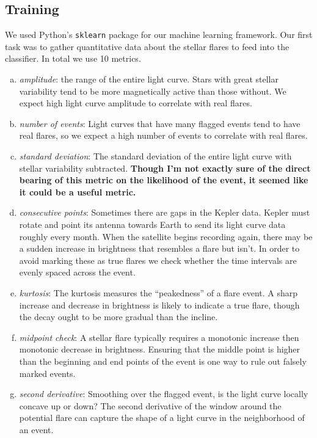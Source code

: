 \documentclass[11pt]{article}
\begin{document}
\subsection{Training}
\label{sec:train}
We used Python's \verb|sklearn| package for our machine learning
framework.  Our first task was to gather quantitative data about the
stellar flares to feed into the classifier.  In total we use 10
metrics.
\begin{enumerate}[(a)]
\item \emph{amplitude}: the range of the entire light curve.  Stars
  with great stellar variability tend to be more magnetically active
  than those without.  We expect high light curve amplitude to
  correlate with real flares.
\item \emph{number of events}: Light curves that have many flagged
  events tend to have real flares, so we expect a high number of
  events to correlate with real flares.
\item \emph{standard deviation}: The standard deviation of the entire
  light curve with stellar variability subtracted.  \textbf{Though I'm
    not exactly sure of the direct bearing of this metric on the
    likelihood of the event, it seemed like it could be a useful
    metric.}
\item \emph{consecutive points}: Sometimes there are gaps in the
  Kepler data.  Kepler must rotate and point its antenna towards Earth
  to send its light curve data roughly every month.  When the
  satellite begins recording again, there may be a sudden increase in
  brightness that resembles a flare but isn't.  In order to avoid
  marking these as true flares we check whether the time intervals are
  evenly spaced across the event.
\item \emph{kurtosis}: The kurtosis measures the ``peakedness'' of a
  flare event.  A sharp increase and decrease in brightness is likely
  to indicate a true flare, though the decay ought to be more gradual
  than the incline.
\item \emph{midpoint check}: A stellar flare typically requires a
  monotonic increase then monotonic decrease in brightness.  Ensuring
  that the middle point is higher than the beginning and end points of
  the event is one way to rule out falsely marked events.
\item \emph{second derivative}: Smoothing over the flagged event, is
  the light curve locally concave up or down?  The second derivative
  of the window around the potential flare can capture the shape of a
  light curve in the neighborhood of an event.

\end{enumerate}
\end{document}

